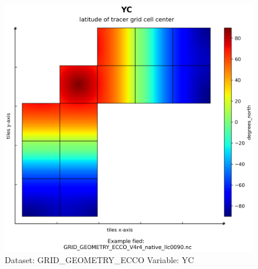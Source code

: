\begin{figure}[H]
\centering
\includegraphics[scale=0.55]{../images/plots/native_plots_coords/Geometry_Parameters_for_the_Lat-Lon-Cap_90_(llc90)_Native_Model_Grid_(Version_4_Release_4)/YC.png}
\caption{Dataset: GRID\_GEOMETRY\_ECCO Variable: YC}
\label{tab:table-GRID_GEOMETRY_ECCO_YC-Plot}
\end{figure}
\pagebreak
